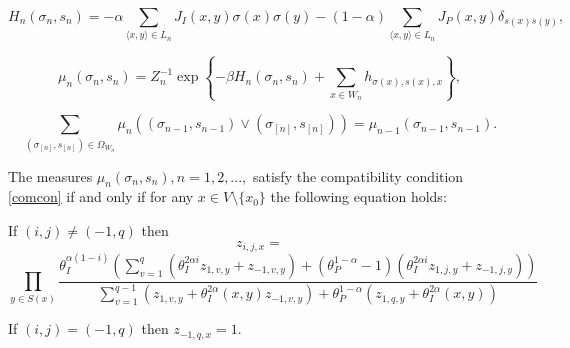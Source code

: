 \documentclass[10pt,a4paper]{amsart}
\begin{document}
\begin{equation}\label{Ham}
H_n(\sigma_n, s_n)=-\alpha \sum_{\langle x,y\rangle \in L_n}J_{I}(x,y)\sigma(x)\sigma(y)-(1-\alpha)\sum_{\langle x,y\rangle \in L_n}J_{P}(x,y)\delta_{s(x)s(y)},
\end{equation}

\begin{equation}\label{mu}
\mu_{n}(\sigma_n, s_n)=Z_{n}^{-1}\exp\left\{-\beta H_n(\sigma_n,s_n)+\sum _{x\in
W_n}h_{\sigma(x),s(x),x}\right\},
\end{equation}

\begin{equation}\label{comcon}
\sum\limits_{(\sigma_{[n]}, s_{[n]})  \in {\Omega _{{W_n}}}} {\mu_{n}((\sigma_{n-1}, s_{n-1}) \vee (\sigma_{[n]}, s_{[n]})) = \mu _{n -
1}(\sigma_{n-1}, s_{n-1})}.
\end{equation}

\begin{theorem}\label{comp.eq} The measures $\mu_{n}(\sigma_n, s_n), n=1,2,...,$ satisfy the compatibility condition \eqref{comcon} if and only if for any $x\in V\setminus\{x_0\}$ the following equation holds:

If $(i,j)\neq(-1,q)$ then
$$z_{i,j,x}=$$
\begin{equation}\label{funceq}
\prod\limits_{y\in S(x)}\frac{\theta_{I}^{\alpha (1-i)}\left(\sum\limits_{v=1}^{q}\left(\theta_{I}^{2\alpha i}z_{1,v,y}+z_{-1,v,y} \right)+\left(\theta_{P}^{1-\alpha}-1\right)\left(\theta_{I}^{2\alpha i}z_{1,j,y}+z_{-1,j,y}\right)\right) }{\sum\limits_{v=1}^{q-1}\left(z_{1,v,y}+\theta_{I}^{2\alpha }(x,y)z_{-1,v,y} \right)+\theta_{P}^{1-\alpha}\left(z_{1,q,y}+\theta_{I}^{2\alpha }(x,y)\right)}\end{equation}

If $(i,j)=(-1,q)$ then  $z_{-1,q,x}=1$.
\end{theorem}
\end{document}
